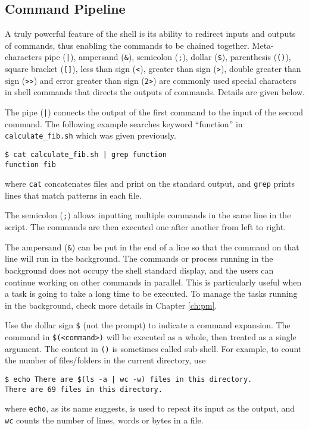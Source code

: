 \subsection{Command Pipeline}

A truly powerful feature of the shell is its ability to redirect inputs and outputs of commands, thus enabling the commands to be chained together. Meta-characters pipe (\verb?|?), ampersand (\verb|&|), semicolon (\verb|;|), dollar (\verb|$|), parenthesis (\verb|()|), square bracket (\verb|[]|), less than sign (\verb|<|), greater than sign (\verb|>|), double greater than sign (\verb|>>|) and error greater than sign (\verb|2>|) are commonly used special characters in shell commands that directs the outputs of commands. Details are given below.

The pipe (\verb$|$) connects the output of the first command to the input of the second command. The following example searches keyword ``function'' in \verb|calculate_fib.sh| which was given previously.
\begin{lstlisting}
$ cat calculate_fib.sh | grep function
function fib
\end{lstlisting}
where \verb|cat| concatenates files and print on the standard output, and \verb|grep| prints lines that match patterns in each file.

The semicolon (\verb|;|) allows inputting multiple commands in the same line in the script. The commands are then executed one after another from left to right.

The ampersand (\verb|&|) can be put in the end of a line so that the command on that line will run in the background. The commands or process running in the background does not occupy the shell standard display, and the users can continue working on other commands in parallel. This is particularly useful when a task is going to take a long time to be executed. To manage the tasks running in the background, check more details in Chapter \ref{ch:pm}.

Use the dollar sign \verb|$| (not the prompt) to indicate a command expansion. The command in \verb|$(<command>)| will be executed as a whole, then treated as a single argument. The content in \verb|()| is sometimes called sub-shell. For example, to count the number of files/folders in the current directory, use
\begin{lstlisting}
$ echo There are $(ls -a | wc -w) files in this directory.
There are 69 files in this directory.
\end{lstlisting}
where \verb|echo|, as its name suggests, is used to repeat its input as the output, and \verb|wc| counts the number of lines, words or bytes in a file.

